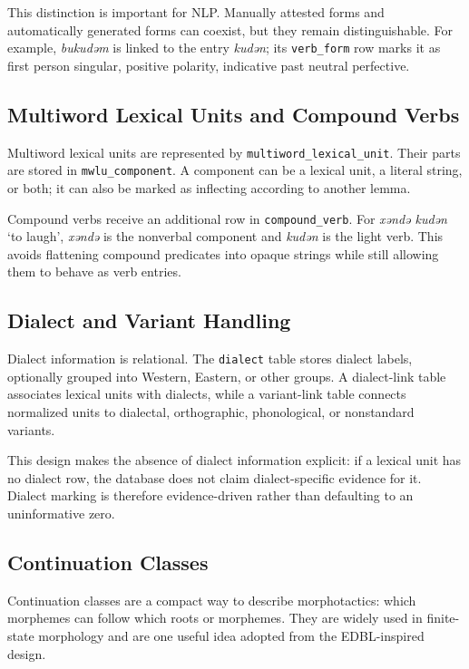 \documentclass[11pt]{article}
\newcommand{\gil}[1]{\textit{#1}}
\newcommand{\code}[1]{\texttt{#1}}
\begin{document}
This distinction is important for NLP. Manually attested forms and automatically generated forms can coexist, but they remain distinguishable. For example, \gil{bukudǝm} is linked to the entry \gil{kudǝn}; its \code{verb\_form} row marks it as first person singular, positive polarity, indicative past neutral perfective.

\subsection{Multiword Lexical Units and Compound Verbs}

Multiword lexical units are represented by \code{multiword\_lexical\_unit}. Their parts are stored in \code{mwlu\_component}. A component can be a lexical unit, a literal string, or both; it can also be marked as inflecting according to another lemma.

Compound verbs receive an additional row in \code{compound\_verb}. For \gil{xǝndǝ kudǝn} `to laugh', \gil{xǝndǝ} is the nonverbal component and \gil{kudǝn} is the light verb. This avoids flattening compound predicates into opaque strings while still allowing them to behave as verb entries.

\subsection{Dialect and Variant Handling}

Dialect information is relational. The \code{dialect} table stores dialect labels, optionally grouped into Western, Eastern, or other groups. A dialect-link table associates lexical units with dialects, while a variant-link table connects normalized units to dialectal, orthographic, phonological, or nonstandard variants.

This design makes the absence of dialect information explicit: if a lexical unit has no dialect row, the database does not claim dialect-specific evidence for it. Dialect marking is therefore evidence-driven rather than defaulting to an uninformative zero.

\subsection{Continuation Classes}

Continuation classes are a compact way to describe morphotactics: which morphemes can follow which roots or morphemes. They are widely used in finite-state morphology and are one useful idea adopted from the EDBL-inspired design.
\end{document}
